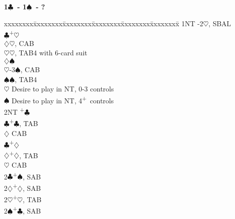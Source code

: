 \documentclass[10pt]{article}
\renewcommand{\c}{$\clubsuit$}
\renewcommand{\d}{$\diamondsuit$}
\newcommand{\h}{$\heartsuit$}
\newcommand{\s}{$\spadesuit$}
\newcommand{\p}{\textsuperscript{+}}
\newenvironment{bidtable}[1][]
{\textbf{#1}
  \begin{adjustwidth}{1em}{}
    \addvspace{2pt}
    \begin{tabbing}
      xxxxxxxx\=xxxxxxxx\=xxxxxxxx\=xxxxxxxx\=xxxxxxxx\=xxxxxxxx\=\kill}
{\end{tabbing}\end{adjustwidth}\bigskip}%
\begin{document}
\begin{multicols*}{2}
\begin{bidtable}[1\c\ - 1\s\ - ?]
1NT -2\h, SBAL                                \\
    \c {}\p\h                               \\
    \>     \d {}\h, CAB                     \\
    \>     \h {}\h, TAB4 with 6-card suit   \\
    \d {}\s                                 \\
    \>     \h {}-3\s, CAB                   \\
    \>     \s {}\s, TAB4                    \\
    \h \> Desire to play in NT, 0-3 controls  \\
    \s \> Desire to play in NT, 4\p\ controls \\
    \> 2NT \p\c                               \\
    \>     \c {}\p\c, TAB                   \\
    \>     \d \> CAB                          \\
    \c {}\p\d                               \\
    \>     \d {}\p\d, TAB                   \\
    \>     \h \> CAB                          \\
2\c {}\p\s, SAB                                 \\
2\d {}\p\d, SAB                                 \\
2\h {}\p\h, TAB                                 \\
2\s {}\p\c, SAB
\end{bidtable}


\end{multicols*}
\end{document}
